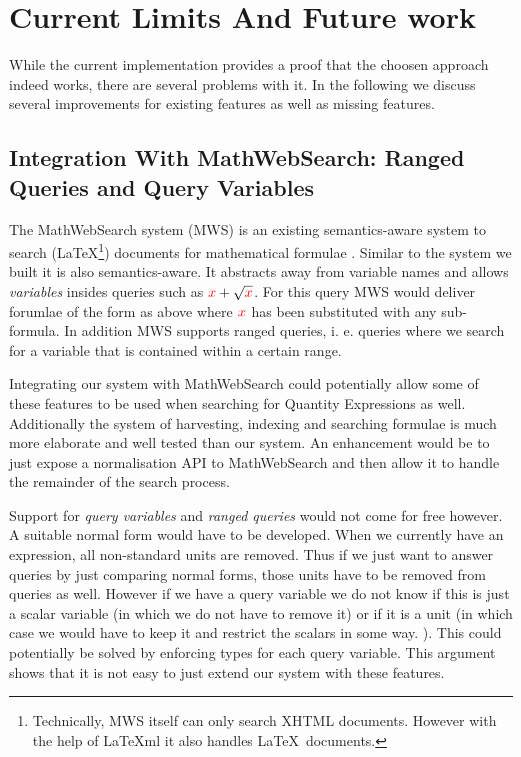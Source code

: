 \section{Current Limits And Future work}
\label{sec:future}

While the current implementation provides a proof that the choosen approach indeed works, there are several problems with it. In the following we discuss several improvements for existing features as well as missing features.

\subsection{Integration With MathWebSearch: Ranged Queries and Query Variables}
The MathWebSearch system (MWS) is an existing semantics-aware system to search (\LaTeX\footnote{Technically, MWS itself can only search XHTML documents. However with the help of \LaTeX{}ml \cite{Miller:latexml:base} it also handles \LaTeX \ documents. }) documents for mathematical formulae \cite{HamKohPro:man14}. Similar to the system we built it is also semantics-aware. It abstracts away from variable names and allows \textit{variables} insides queries such as $ { \color{red} x} + \sqrt{\color{red} x}$. For this query MWS would deliver forumlae of the form as above where $ { \color{red} x} $ has been substituted with any sub-formula. In addition MWS supports ranged queries, i. e. queries where we search for a variable that is contained within a certain range.

Integrating our system with MathWebSearch could potentially allow some of these features to be used when searching for Quantity Expressions as well. Additionally the system of harvesting, indexing and searching formulae is much more elaborate and well tested than our system. An enhancement would be to just expose a normalisation API to MathWebSearch and then allow it to handle the remainder of the search process.

Support for \textit{query variables} and \textit{ranged queries} would not come for free however. A suitable normal form would have to be developed. When we currently have an expression, all non-standard units are removed. Thus if we just want to answer queries by just comparing normal forms, those units have to be removed from queries as well. However if we have a query variable we do not know if this is just a scalar variable (in which we do not have to remove it) or if it is a unit (in which case we would have to keep it and restrict the scalars in some way. ). This could potentially be solved by enforcing types for each query variable. This argument shows that it is not easy to just extend our system with these features.

